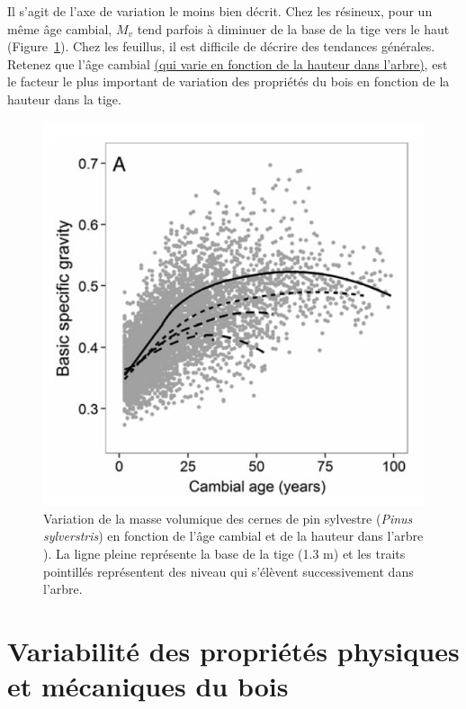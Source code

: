 Il s'agit de l'axe de variation le moins bien décrit. Chez les résineux, pour un même âge cambial, $M_v$ tend parfois à diminuer de la base de la tige vers le haut (Figure~\ref{fig:densite_haut_dave}). Chez les feuillus, il est difficile de décrire des tendances générales. Retenez que l'âge cambial \hyperref[croissance_cernes]{(qui varie en fonction de la hauteur dans l'arbre)}, est le facteur le plus important de variation des propriétés du bois en fonction de la hauteur dans la tige.\\

\begin{figure}[h]
	\centering
	\includegraphics[scale=0.5]{img/ch7_densite_haut_dave}
	\caption{Variation de la masse volumique des cernes de pin sylvestre (\textit{Pinus sylverstris}) en fonction de l'âge cambial et de la hauteur dans l'arbre \cite{auty2014models}). La ligne pleine représente la base de la tige (1.3 m) et les traits pointillés représentent des niveau qui s'élèvent successivement dans l'arbre.}
	\label{fig:densite_haut_dave}
\end{figure}


\section{Variabilité des propriétés physiques et mécaniques du bois}

